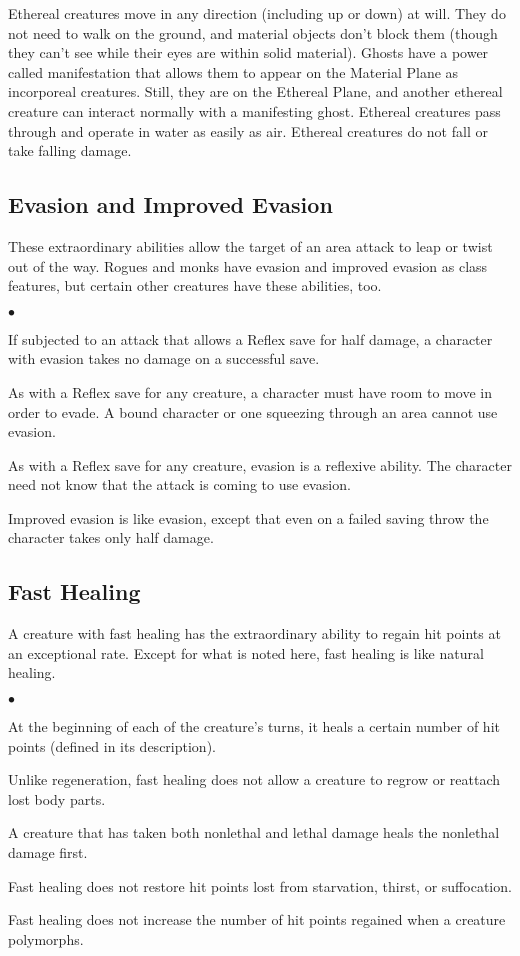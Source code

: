 Ethereal creatures move in any direction (including up or down) at will. They do not need to walk on the ground, and material objects don't block them (though they can't see while their eyes are within solid material).
Ghosts have a power called manifestation that allows them to appear on the Material Plane as incorporeal creatures. Still, they are on the Ethereal Plane, and another ethereal creature can interact normally with a manifesting ghost. Ethereal creatures pass through and operate in water as easily as air. Ethereal creatures do not fall or take falling damage. 

\subsection{Evasion and Improved Evasion}

These extraordinary abilities allow the target of an area attack to leap or twist out of the way. Rogues and monks have evasion and improved evasion as class features, but certain other creatures have these abilities, too.

\begin{list}{$\bullet$}{\itemspace}
	\item If subjected to an attack that allows a Reflex save for half damage, a character with evasion takes no damage on a successful save. 
	\item As with a Reflex save for any creature, a character must have room to move in order to evade. A bound character or one squeezing through an area cannot use evasion.
	\item As with a Reflex save for any creature, evasion is a reflexive ability. The character need not know that the attack is coming to use evasion.
	\item Improved evasion is like evasion, except that even on a failed saving throw the character takes only half damage.
\end{list}

\subsection{Fast Healing}

A creature with fast healing has the extraordinary ability to regain hit points at an exceptional rate. Except for what is noted here, fast healing is like natural healing. 

\begin{list}{$\bullet$}{\itemspace}
	\item At the beginning of each of the creature's turns, it heals a certain number of hit points (defined in its description).
	\item Unlike regeneration, fast healing does not allow a creature to regrow or reattach lost body parts.
	\item A creature that has taken both nonlethal and lethal damage heals the nonlethal damage first.
	\item Fast healing does not restore hit points lost from starvation, thirst, or suffocation.
	\item Fast healing does not increase the number of hit points regained when a creature polymorphs.
\end{list}

